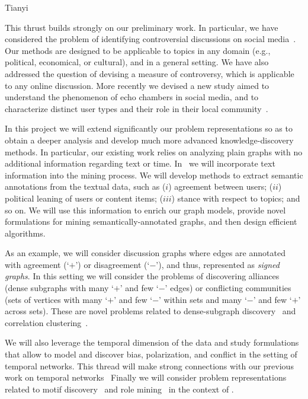 \documentclass[a4paper,11pt]{article}
\begin{document}
Tianyi 








This thrust builds strongly on our preliminary work.
In particular, we have considered the problem 
of identifying controversial discussions on social media~\cite{garimella2018quantifying}.
Our methods are designed to be applicable to topics in any domain 
(e.g., political, economical, or cultural), and in a general setting.
We have also addressed the question of devising a measure of controversy,
which is applicable to any online discussion.
More recently we devised a new study aimed to 
understand the phenomenon of echo chambers in social media, 
and to characterize distinct user types and their role in their local community~\cite{garimella2018political}.

\smallskip
In this project we will extend significantly our problem representations
so as to obtain a deeper analysis and develop much more advanced knowledge-discovery methods.
In particular, our existing work relies on analyzing plain graphs
with no additional information regarding text or time. 
In \acronym\ we will incorporate text information into the mining process.
We will develop methods to extract semantic annotations from the textual data, 
such as
($i$) agreement between users; 
($ii$) political leaning of users or content items; 
($iii$) stance with respect to topics; 
and so on.
We will use this information to enrich our graph models,
provide novel formulations for mining semantically-annotated graphs, 
and then design efficient algorithms.

\smallskip
As an example, we will consider discussion graphs
where edges are annotated with agreement (`$+$') or disagreement (`$-$'), 
and thus, represented as {\em signed graphs}.
In this setting we will consider the problems of discovering alliances 
(dense subgraphs with many `$+$' and few `$-$' edges) 
or conflicting communities
(sets of vertices with many `$+$' and few `$-$' within sets and many `$-$' and few `$+$' across sets). 
These are novel problems related to dense-subgraph discovery~\cite{rozenshtein2014event,sozio2010community-search,tatti2015density,tsourakakis2013denser}
and correlation clustering~\cite{bansal2004correlation,gionis2007clustering}.

\smallskip
We will also leverage the temporal dimension of the data
and study formulations that allow to model and discover 
bias, polarization, and conflict in the setting of temporal networks.
This thread will make strong connections with our previous work on 
temporal networks~\cite{rozenshtein2016temporal, rozenshtein2016reconstructing, rozenshtein2017finding}
Finally we will consider problem representations  
related to motif discovery~\cite{aslay2018mining,coletto2017motif} and role mining~\cite{arockiasamy2016combinatorial} 
in the context of \acronym.
\end{document}
